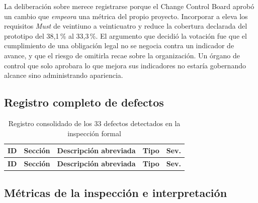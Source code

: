 \noindent
La deliberación sobre  merece registrarse porque el Change Control Board aprobó un cambio
que \emph{empeora} una métrica del propio proyecto. Incorporar  a  eleva los
requisitos \emph{Must} de veintiuno a veinticuatro y reduce la cobertura declarada del prototipo del
38,1\,\% al 33,3\,\%. El argumento que decidió la votación fue que el cumplimiento de una obligación
legal no se negocia contra un indicador de avance, y que el riesgo de omitirla recae sobre la
organización. Un órgano de control que solo aprobara lo que mejora sus indicadores no estaría
gobernando alcance sino administrando apariencia.

\subsection{Registro completo de defectos}

\begin{longtable}{|M{1.5cm}|L{2.4cm}|L{7.4cm}|M{1.9cm}|M{1.5cm}|}
\caption{Registro consolidado de los 33 defectos detectados en la inspección formal}
\label{tab:defectos}\\
\hline
{}\textbf{ID} & \textbf{Sección} & \textbf{Descripción abreviada} & \textbf{Tipo} & \textbf{Sev.}\\ \hline
\endfirsthead
\hline
{}\textbf{ID} & \textbf{Sección} & \textbf{Descripción abreviada} & \textbf{Tipo} & \textbf{Sev.}\\ \hline
\endhead

\end{longtable}

\subsection{Métricas de la inspección e interpretación}

